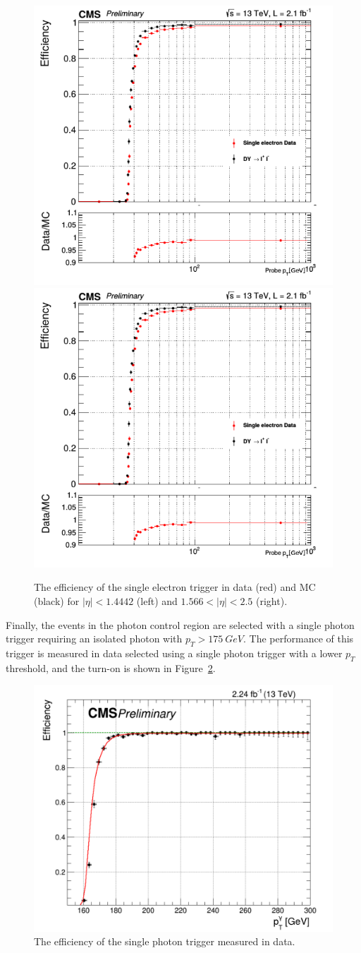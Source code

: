 \begin{figure}[ht]
  \centering
 \includegraphics[width=.49\textwidth]{monojet_etrigger_1.png} 
 \includegraphics[width=.49\textwidth]{monojet_etrigger_1.png} 
 \caption{The efficiency of the single electron trigger in data (red) and MC (black) for $|\eta| < 1.4442$ (left) and $1.566 < |\eta| < 2.5$ (right).}
 \label{fig:trigger_eff_e}
\end{figure}

Finally, the events in the photon control region are selected with a single photon trigger requiring an isolated photon with $p_T > \SI{175}{GeV}$. The performance of this trigger is measured in data selected using a single photon trigger with a lower $p_T$ threshold, and the turn-on is shown in Figure~\ref{fig:trigger_eff_gamma}.

\begin{figure}[ht]
  \centering
 \includegraphics[width=.6\textwidth]{monojet_gammatrigger.png} 
 \caption{The efficiency of the single photon trigger measured in data.}
 \label{fig:trigger_eff_gamma}
\end{figure}

